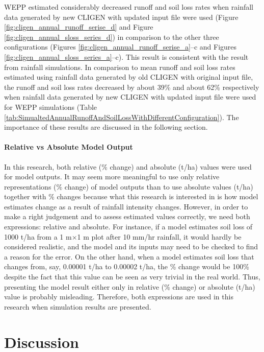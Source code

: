 WEPP estimated considerably decreased runoff and soil loss rates when rainfall
data generated by new CLIGEN with updated input file were used (Figure
\ref{fig:cligen_annual_runoff_serise_d} and Figure
\ref{fig:cligen_annual_sloss_series_d}) in comparison to the other three
configurations (Figures
\ref{fig:cligen_annual_runoff_serise_a}--c and Figures
\ref{fig:cligen_annual_sloss_series_a}--c). This result is consistent with the
result from rainfall simulations. In comparison to mean runoff and soil loss
rates estimated using rainfall data generated by old CLIGEN with
original input file, the runoff and soil loss rates decreased by about 39\% and
about 62\% respectively when rainfall data generated by new CLIGEN with updated
input file were used for WEPP simulations (Table
\ref{tab:SimualtedAnnualRunoffAndSoilLossWithDifferentConfiguration}).
The importance of these results are discussed in the following section.

\paragraph{Relative vs Absolute Model Output} In this research, both relative
(\% change) and absolute (t/ha) values were used for model outputs. It may seem
more meaningful to use only relative representations (\% change) of model
outputs than to use absolute values (t/ha) together with \% changes because what
this research is interested in is how model estimates change as a result of
rainfall intensity changes. However, in order to make a right judgement and to
assess estimated values correctly, we need both expressions: relative and
absolute. For instance, if a model estimates soil loss of 1000 t/ha from
a 1 m$\times$1 m plot after 10 mm/hr rainfall, it would hardly be considered
realistic, and the model and its inputs may need to be checked to find a reason
for the error. On the other hand, when a model estimates soil loss that changes
from, say, 0.00001 t/ha to 0.00002 t/ha, the \% change would be 100\% despite
the fact that this value can be seen as very trivial in the real world. Thus,
presenting the model result either only in relative (\% change) or absolute
(t/ha) value is probably misleading. Therefore, both expressions are used in
this research when simulation results are presented.

\section{Discussion}
\label{sec:ImprovedCLIGENDiscussion}

